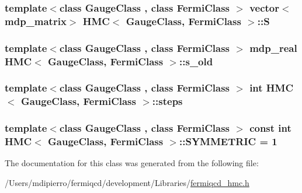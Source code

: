 \label{class_h_m_c_a49121fbbef9d15281bc5a045fa0d07ce}
\hypertarget{class_h_m_c_a6007dbb2f937f629bbf5253a915b18fa}{
\subsubsection[{S}]{\setlength{\rightskip}{0pt plus 5cm}template$<$class GaugeClass , class FermiClass $>$ vector$<${\bf mdp\_\-matrix}$>$ {\bf HMC}$<$ GaugeClass, FermiClass $>$::{\bf S}}}
\label{class_h_m_c_a6007dbb2f937f629bbf5253a915b18fa}
\hypertarget{class_h_m_c_a54ce598a989a71f3bfbb58057dcea2ed}{
\subsubsection[{s\_\-old}]{\setlength{\rightskip}{0pt plus 5cm}template$<$class GaugeClass , class FermiClass $>$ {\bf mdp\_\-real} {\bf HMC}$<$ GaugeClass, FermiClass $>$::{\bf s\_\-old}}}
\label{class_h_m_c_a54ce598a989a71f3bfbb58057dcea2ed}
\hypertarget{class_h_m_c_a0254c831e713cdad8e2bbec4c247c045}{
\subsubsection[{steps}]{\setlength{\rightskip}{0pt plus 5cm}template$<$class GaugeClass , class FermiClass $>$ int {\bf HMC}$<$ GaugeClass, FermiClass $>$::{\bf steps}}}
\label{class_h_m_c_a0254c831e713cdad8e2bbec4c247c045}
\hypertarget{class_h_m_c_adf96eacce9b78dfd329076b35b8544f5}{
\subsubsection[{SYMMETRIC}]{\setlength{\rightskip}{0pt plus 5cm}template$<$class GaugeClass , class FermiClass $>$ const int {\bf HMC}$<$ GaugeClass, FermiClass $>$::{\bf SYMMETRIC} = 1}}
\label{class_h_m_c_adf96eacce9b78dfd329076b35b8544f5}


The documentation for this class was generated from the following file:\begin{DoxyCompactItemize}
\item 
/Users/mdipierro/fermiqcd/development/Libraries/\hyperlink{fermiqcd__hmc_8h}{fermiqcd\_\-hmc.h}\end{DoxyCompactItemize}
